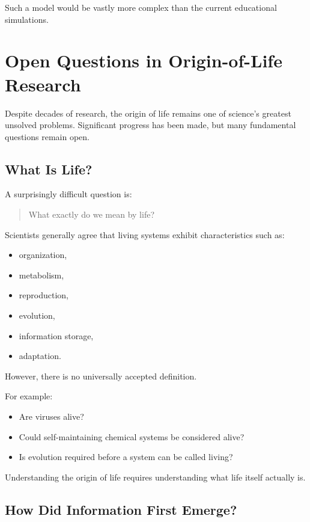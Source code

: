 \documentclass[
  oneside,
  openany]{book}
\providecommand{\tightlist}{%
  \setlength{\itemsep}{0pt}\setlength{\parskip}{0pt}}
\begin{document}
Such a model would be vastly more complex than the current educational simulations.

\section{Open Questions in Origin-of-Life Research}\label{open-questions-in-origin-of-life-research}

Despite decades of research, the origin of life remains one of science's greatest unsolved problems. Significant progress has been made, but many fundamental questions remain open.

\subsection{What Is Life?}\label{what-is-life}

A surprisingly difficult question is:

\begin{quote}
What exactly do we mean by life?
\end{quote}

Scientists generally agree that living systems exhibit characteristics such as:

\begin{itemize}
\tightlist
\item
  organization,
\item
  metabolism,
\item
  reproduction,
\item
  evolution,
\item
  information storage,
\item
  adaptation.
\end{itemize}

However, there is no universally accepted definition.

For example:

\begin{itemize}
\tightlist
\item
  Are viruses alive?
\item
  Could self-maintaining chemical systems be considered alive?
\item
  Is evolution required before a system can be called living?
\end{itemize}

Understanding the origin of life requires understanding what life itself actually is.

\subsection{How Did Information First Emerge?}\label{how-did-information-first-emerge}
\end{document}

